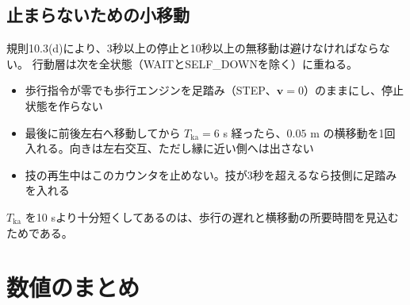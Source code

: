 \documentclass[a4paper,11pt]{ltjsarticle}
\newcommand{\vc}[1]{\bm{#1}}
\begin{document}
\subsection{止まらないための小移動}\label{sec:keepalive}

規則10.3(d)により、3秒以上の停止と10秒以上の無移動は避けなければならない。
行動層は次を全状態（WAITとSELF\_DOWNを除く）に重ねる。
\begin{itemize}
\item 歩行指令が零でも歩行エンジンを足踏み（STEP、$\vc v=0$）のままにし、停止状態を作らない
\item 最後に前後左右へ移動してから $T_\mathrm{ka}=6$ s 経ったら、$0.05$ m の横移動を1回入れる。向きは左右交互、ただし縁に近い側へは出さない
\item 技の再生中はこのカウンタを止めない。技が3秒を超えるなら技側に足踏みを入れる
\end{itemize}
$T_\mathrm{ka}$ を10 sより十分短くしてあるのは、歩行の遅れと横移動の所要時間を見込むためである。

\section{数値のまとめ}\label{sec:params}
\end{document}
